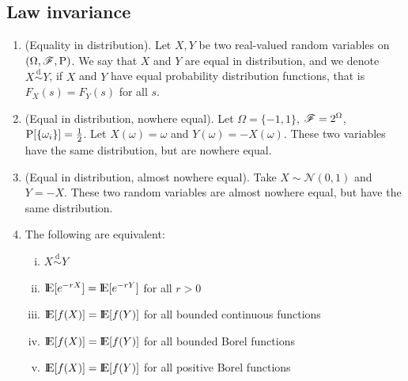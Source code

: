 \documentclass[a4paper,10pt]{article}
\begin{document}
\subsection{Law invariance}
\begin{enumerate}
 \item (Equality in distribution). 
      Let $X,Y$ be two real-valued random variables on $(\Omega,\mathscr{F},\mathrm{P})$.
      We say that $X$ and $Y$ are equal in distribution, and we denote $X\overset{\mathrm{d}}{\sim} Y$,
      if $X$ and $Y$ have equal probability distribution functions, that is $F_X(s) = F_Y(s)$ for all $s$.

 \item (Equal in distribution, nowhere equal). Let $\Omega = \{-1,1\}$, $\mathscr{F}=2^\Omega$, $\mathrm{P}[\{\omega_i\}]=\frac{1}{2}$.
       Let $X(\omega) = \omega$ and $Y(\omega) = -X(\omega)$. These two variables have the same distribution, but 
       are nowhere equal.
 
 \item (Equal in distribution, almost nowhere equal). Take $X\sim \mathcal{N}(0,1)$ and $Y=-X$. These 
       two random variables are almost nowhere equal, but have the same distribution.
       
 \item The following are equivalent:
      \begin{enumerate}[i.]
       \item $X\overset{\mathrm{d}}{\sim} Y$
       \item $\E[e^{-rX}]=\E[e^{-rY}]$ for all $r>0$
       \item $\E[f(X)] = \E[f(Y)]$ for all bounded continuous functions
       \item $\E[f(X)] = \E[f(Y)]$ for all bounded Borel functions
       \item $\E[f(X)] = \E[f(Y)]$ for all positive Borel functions	
      \end{enumerate}

\end{enumerate}
\end{document}
